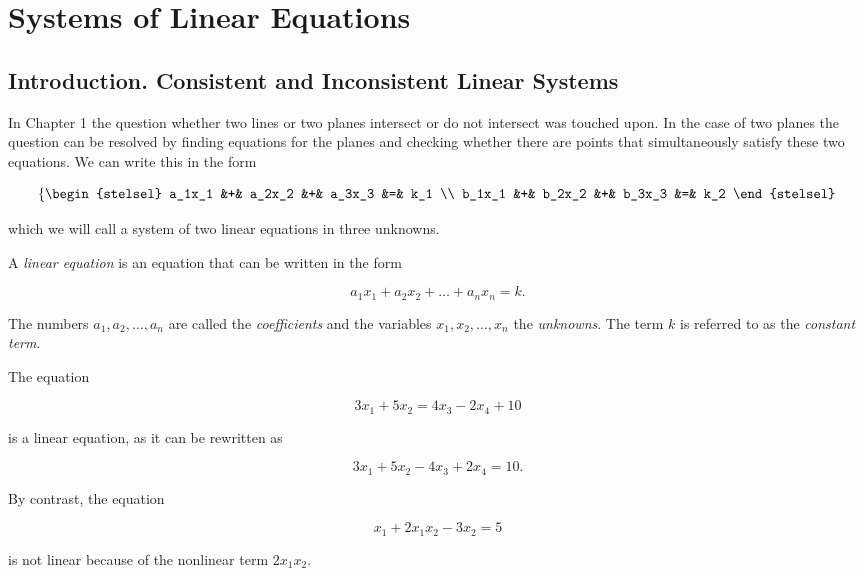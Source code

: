 \section{Systems of Linear Equations}
\label{Section:LinSystems}

\subsection{Introduction.  Consistent and Inconsistent Linear Systems}
\label{Subsec:LinSystems:Intro}
In Chapter 1 the question whether  two lines or two planes intersect or do not intersect was touched upon. In the case of two planes  the question can be resolved by finding equations for the planes and checking whether there are points that simultaneously satisfy these two equations. We can write this in the form

$$
  \left\{
       \begin{stelsel} 
       a_1x_1 &+& a_2x_2 &+& a_3x_3 &=& k_1 \\
      b_1x_1 &+& b_2x_2 &+& b_3x_3 &=& k_2
       \end{stelsel}
  \right.
$$


which we will call a system of two linear equations in three unknowns.\\

\begin{dfn}
\label{Dfn:LinSystems:LinearEquation}   
A \emph{linear equation} is an equation that can be written in the form

$$

   a_1x_1 + a_2x_2 + \ldots + a_nx_n = k.
$$

The numbers  $a_1,a_2,\ldots,a_n$ are called the \emph{coefficients} and the variables $x_1,x_2, \ldots, x_n$ the \emph{unknowns}.  The term $k$ is referred to as the \emph{constant term}.
\end{dfn}

\begin{ex}
\label{Ex:LinSystems:LinearEquation}
The equation

$$

    3x_1 + 5x_2 = 4x_3 - 2x_4 + 10
$$

is a linear equation, as it can be rewritten as

$$

    3x_1 + 5x_2 - 4x_3 + 2x_4 = 10.
$$

By contrast, the equation

$$

  x_1 + 2x_1x_2 - 3x_2 = 5
$$

is not linear because of the nonlinear term $2x_1x_2$.
\end{ex}

